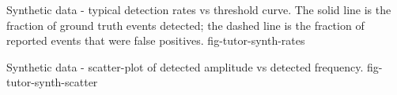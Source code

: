 {Synthetic data - typical detection rates vs threshold curve. The solid line
is the fraction of ground truth events detected; the dashed line is the
fraction of reported events that were false positives.}
{fig-tutor-synth-rates}

{Synthetic data - scatter-plot of detected amplitude vs detected frequency.}
{fig-tutor-synth-scatter}

%
%
\clearpage

\clearpage


%
